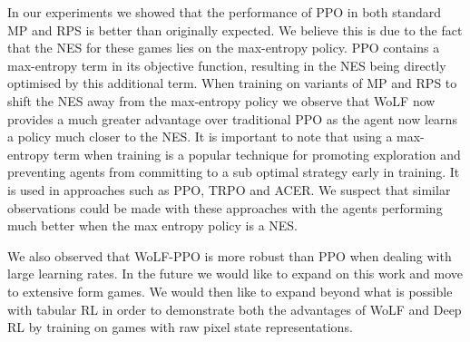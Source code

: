 \documentclass[conference]{IEEEtran}
\begin{document}
In our experiments we showed that the performance of PPO in both standard MP and RPS is better than originally expected. We believe this is due to the fact that the NES for these games lies on the max-entropy policy. PPO contains a max-entropy term in its objective function, resulting in the NES being directly optimised by this additional term. When training on variants of MP and RPS to shift the NES away from the max-entropy policy we observe that WoLF now provides a much greater advantage over traditional PPO as the agent now learns a policy much closer to the NES. It is important to note that using a max-entropy term when training is a popular technique for promoting exploration and preventing agents from committing to a sub optimal strategy early in training. It is used in approaches such as PPO\cite{schulman2017proximal}, TRPO\cite{schulman2015trust} and ACER\cite{Wang2017SampleEA}. We suspect that similar observations could be made with these approaches with the agents performing much better when the max entropy policy is a NES.

We also observed that WoLF-PPO is more robust than PPO when dealing with large learning rates. In the future we would like to expand on this work and move to extensive form games. We would then like to expand beyond what is possible with tabular RL in order to demonstrate both the advantages of WoLF and Deep RL by training on games with raw pixel state representations.





\end{document}
